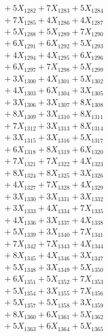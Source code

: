 \documentclass[a4paper,10pt]{article}
\begin{document}
{\begin{align}
&\;  + 5 X_{1282} + 7 X_{1283} + 5 X_{1284} \\[0.3ex]
&\;  + 7 X_{1285} + 4 X_{1286} + 4 X_{1287} \\[0.3ex]
&\;  + 5 X_{1288} + 5 X_{1289} + 7 X_{1290} \\[0.3ex]
&\;  + 6 X_{1291} + 6 X_{1292} + 5 X_{1293} \\[0.3ex]
&\;  + 4 X_{1294} + 4 X_{1295} + 6 X_{1296} \\[0.3ex]
&\;  + 6 X_{1297} + 7 X_{1298} + 5 X_{1299} \\[0.5ex]\allowbreak
&\;  + 3 X_{1300} + 4 X_{1301} + 5 X_{1302} \\[0.3ex]
&\;  + 4 X_{1303} + 6 X_{1304} + 3 X_{1305} \\[0.3ex]
&\;  + 3 X_{1306} + 3 X_{1307} + 8 X_{1308} \\[0.3ex]
&\;  + 8 X_{1309} + 3 X_{1310} + 8 X_{1311} \\[0.3ex]
&\;  + 7 X_{1312} + 3 X_{1313} + 8 X_{1314} \\[0.3ex]
&\;  + 3 X_{1315} + 3 X_{1316} + 5 X_{1317} \\[0.3ex]
&\;  + 6 X_{1318} + 8 X_{1319} + 6 X_{1320} \\[0.3ex]
&\;  + 7 X_{1321} + 7 X_{1322} + 4 X_{1323} \\[0.3ex]
&\;  + 8 X_{1324} + 8 X_{1325} + 3 X_{1326} \\[0.3ex]
&\;  + 4 X_{1327} + 7 X_{1328} + 4 X_{1329} \\[0.5ex]\allowbreak
&\;  + 3 X_{1330} + 3 X_{1331} + 3 X_{1332} \\[0.3ex]
&\;  + 3 X_{1333} + 4 X_{1334} + 7 X_{1335} \\[0.3ex]
&\;  + 4 X_{1336} + 3 X_{1337} + 4 X_{1338} \\[0.3ex]
&\;  + 5 X_{1339} + 3 X_{1340} + 7 X_{1341} \\[0.3ex]
&\;  + 7 X_{1342} + 7 X_{1343} + 4 X_{1344} \\[0.3ex]
&\;  + 8 X_{1345} + 4 X_{1346} + 3 X_{1347} \\[0.3ex]
&\;  + 5 X_{1348} + 3 X_{1349} + 5 X_{1350} \\[0.3ex]
&\;  + 6 X_{1351} + 5 X_{1352} + 7 X_{1353} \\[0.3ex]
&\;  + 5 X_{1354} + 3 X_{1355} + 7 X_{1356} \\[0.3ex]
&\;  + 5 X_{1357} + 5 X_{1358} + 3 X_{1359} \\[0.5ex]\allowbreak
&\;  + 8 X_{1360} + 6 X_{1361} + 5 X_{1362} \\[0.3ex]
&\;  + 5 X_{1363} + 6 X_{1364} + 5 X_{1365} \\[0.3ex]

\end{align}}
\end{document}
